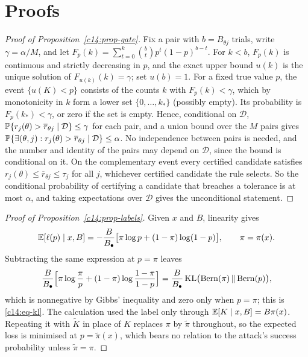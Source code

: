 \section{Proofs}

\begin{proof}[Proof of Proposition~\ref{c14:prop-gate}]
Fix a pair with $b = B_{\theta j}$ trials, write $\gamma = \alpha/M$, and let
$F_p(k) = \sum_{t=0}^{k}\binom{b}{t}p^t(1-p)^{b-t}$. For $k < b$, $F_p(k)$ is continuous
and strictly decreasing in $p$, and the exact upper bound $u(k)$ is the unique solution
of $F_{u(k)}(k) = \gamma$; set $u(b) = 1$. For a fixed true value $p$, the event
$\{u(K) < p\}$ consists of the counts $k$ with $F_p(k) < \gamma$, which by monotonicity
in $k$ form a lower set $\{0,\dots,k_*\}$ (possibly empty). Its probability is
$F_p(k_*) < \gamma$, or zero if the set is empty. Hence, conditional on $\mathcal D$,
$\mathbb{P}\{r_j(\theta) > \overline r_{\theta j} \mid \mathcal D\} \le \gamma$ for each
pair, and a union bound over the $M$ pairs gives
$\mathbb{P}\{\exists(\theta,j): r_j(\theta) > \overline r_{\theta j} \mid \mathcal D\} \le
\alpha$. No independence between pairs is needed, and the number and identity of the
pairs may depend on $\mathcal D$, since the bound is conditional on it. On the
complementary event every certified candidate satisfies $r_j(\theta) \le
\overline r_{\theta j} \le \tau_j$ for all $j$, whichever certified candidate the rule
selects. So the conditional probability of certifying a candidate that breaches a
tolerance is at most $\alpha$, and taking expectations over $\mathcal D$ gives the
unconditional statement.
\end{proof}

\begin{proof}[Proof of Proposition~\ref{c14:prop-labels}]
Given $x$ and $B$, linearity gives
\[
\mathbb{E}[\ell(p)\mid x,B] = -\frac{B}{B_\bullet}\bigl[\pi\log p + (1-\pi)\log(1-p)\bigr],
\qquad \pi = \pi(x).
\]
Subtracting the same expression at $p = \pi$ leaves
\[
\frac{B}{B_\bullet}\Bigl[\pi\log\frac{\pi}{p} + (1-\pi)\log\frac{1-\pi}{1-p}\Bigr]
= \frac{B}{B_\bullet}\,\mathrm{KL}\bigl(\mathrm{Bern}(\pi)\,\|\,\mathrm{Bern}(p)\bigr),
\]
which is nonnegative by Gibbs' inequality and zero only when $p = \pi$; this is
\eqref{c14:eq-kl}. The calculation used the label only through
$\mathbb{E}[K\mid x,B] = B\pi(x)$. Repeating it with $\widetilde K$ in place of $K$ replaces
$\pi$ by $\widetilde\pi$ throughout, so the expected loss is minimised at
$p = \widetilde\pi(x)$, which bears no relation to the attack's success probability
unless $\widetilde\pi = \pi$.
\end{proof}

